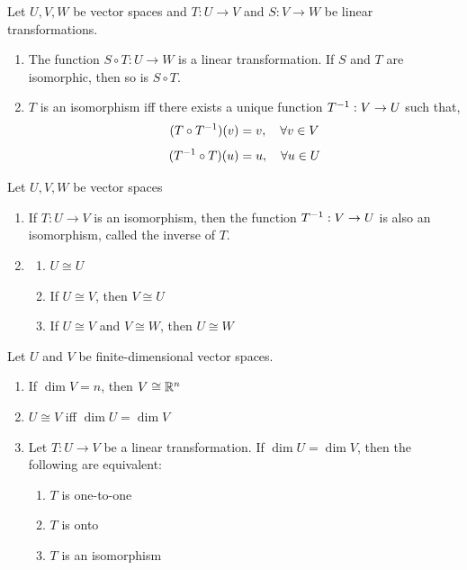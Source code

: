 \begin{theorem}
Let $U, V, W$ be vector spaces and $T: U \to V$ and $S: V \to W$ be linear transformations.
\begin{enumerate}
    \item The function $S \circ T: U \to W$ is a linear transformation. If $S$ and $T$ are isomorphic, then so is $S \circ T$.
    \item $T$ is an isomorphism iff there exists a unique function $T^{-1}: V \to U$ such that,
    $$(T \circ T^{-1})(v) = v, \quad \forall v \in V$$
    $$(T^{-1} \circ T)(u) = u, \quad \forall u \in U$$
\end{enumerate}
\end{theorem}

\begin{remark}
Let $U, V, W$ be vector spaces
\begin{enumerate}
    \item If $T: U \to V$ is an isomorphism, then the function $T^{-1}: V \to U$ is also an isomorphism, called the inverse of $T$.
    \item
    \begin{enumerate}
        \item $U \cong U$
        \item If $U \cong V$, then $V \cong U$
        \item If $U \cong V$ and $V \cong W$, then $U \cong W$
    \end{enumerate}
\end{enumerate}
\end{remark}

\begin{theorem}
Let $U$ and $V$ be finite-dimensional vector spaces.
\begin{enumerate}
    \item If $\dim V = n$, then $V \cong \mathbb{R}^n$
    \item $U \cong V$ iff $\dim U = \dim V$
    \item Let $T: U \to V$ be a linear transformation. If $\dim U = \dim V$, then the following are equivalent:
    \begin{enumerate}
        \item $T$ is one-to-one
        \item $T$ is onto
        \item $T$ is an isomorphism
    \end{enumerate}
\end{enumerate}
\end{theorem}

